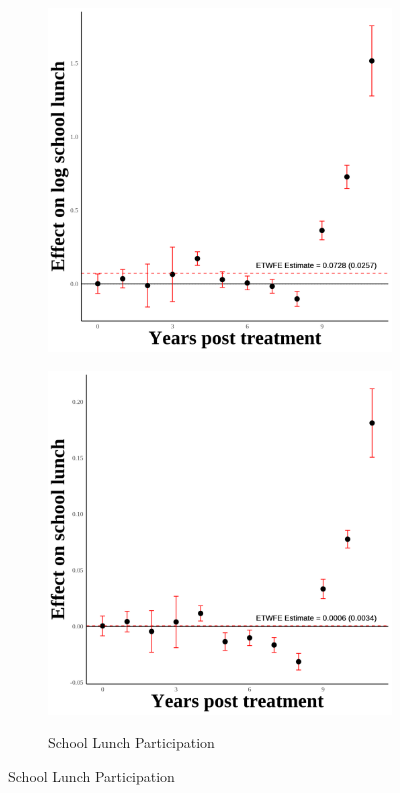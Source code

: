 \documentclass[12pt,english]{article}
\begin{document}
\begin{figure}[H]
\begin{subfigure}[b]{0.3\textwidth}
    \includegraphics[width=\linewidth]{figures/plot18-ln_schl_lunch_event_study-second.png}
    \label{fig:ln-schl-lunch-second}
  \end{subfigure}
  \hfill
  \begin{subfigure}[b]{0.3\textwidth}
    \centering
    \caption{School Lunch Participation}
    \includegraphics[width=\linewidth]{figures/plot19-schl_lunch_event_study-second.png}
    \label{fig:schl-lunch-second}
  \end{subfigure}


\end{figure}
\end{document}

